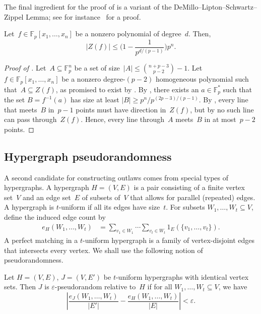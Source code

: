 \documentclass{toc}
\newcommand{\eps}{\varepsilon}
\newcommand{\F}{{\mathbb{F}}}
\newcommand{\beq}{\begin{equation}}
\newcommand{\eeq}{\end{equation}}
\newcommand{\beqn}{\begin{equation*}}
\newcommand{\eeqn}{\end{equation*}}
\begin{document}
The final ingredient for the proof of  is a variant of the DeMillo--Lipton--Schwartz--Zippel Lemma; see for instance~\cite[Appendix~C]{CohenTal:2014} for a proof.

\begin{lemma}\label{lem:DMLSZ}
Let~$f\in\F_p[x_1,\dots,x_n]$ be a nonzero polynomial of degree~$d$.
Then,
\beqn
|Z(f)| \leq \Big(1 - \frac{1}{p^{d/(p-1)}}\Big)p^n.
\eeqn
\end{lemma}


\begin{proof}[Proof of ]
Let~$A\subseteq \F_p^n$ be a set of size~$|A|\leq \binom{n+p-3}{p-2}-1$.
Let~$f\in\F_p[x_1,\dots,x_n]$ be a nonzero degree-$(p-2)$ homogeneous polynomial such that~$A\subseteq Z(f)$, as promised to exist by .
By , there exists an $a\in\F_p^*$ such that the set $B = f^{-1}(a)$ has size at least $|B| \geq p^n/p^{(2p - 3)/(p-1)}$.
By , every line that meets~$B$ in~$p-1$ points must have direction in~$Z(f)$, but by  no such line can pass through~$Z(f)$.
Hence, every line through~$A$ meets~$B$ in at most~$p-2$ points.
\end{proof}


%
\subsection{Hypergraph pseudorandomness}
\label{sec:ARLDCs}

A second candidate for constructing outlaws comes from special types of hypergraphs.
A hypergraph $H = (V,E)$ is a pair consisting of a finite vertex set~$V$ and an edge set~$E$ of subsets of~$V$ that allows for parallel (repeated) edges.
A hypergraph is $t$-uniform if all its edges have size~$t$.
For  subsets $W_1,\dots,W_t\subseteq V$,  define the induced edge count by
\begin{align*}
e_H(W_1,\dots,W_t)
&=
\sum_{v_1\in W_1}\cdots \sum_{v_t\in W_t} 
1_E(\{v_1,\dots,v_t\}).
\end{align*}
A perfect matching in a $t$-uniform hypergraph is a family of vertex-disjoint edges that intersects every vertex.
We shall use the following notion of pseudorandomness.

\begin{definition}
Let $H = (V,E)$, $J = (V, E')$ be $t$-uniform hypergraphs with identical vertex sets.
Then $J$ is $\eps$-pseudorandom relative to~$H$ if for all $W_1,\dots,W_t\subseteq V$, we have
\beq\label{eq:relqr}
\left|
\frac{e_J(W_1,\dots,W_t)}{|E'|} - \frac{e_H(W_1,\dots,W_t)}{|E|}
\right|
< \eps.
\eeq
\end{definition}
\end{document}
